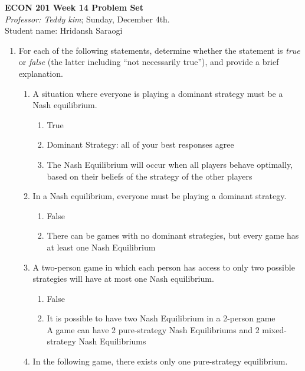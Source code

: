 \documentclass[11pt]{article}
\begin{document}
\begin{center}
\textbf{ECON 201 Week 14 Problem Set}\\
\textit {Professor: Teddy kim};  
Sunday, December 4th.
\\Student name: Hridansh Saraogi
\end{center}

\begin{enumerate}
\item For each of the following statements, determine whether
the statement is \emph{true} or \emph{false} (the latter including ``not necessarily true''), and provide a brief explanation.
    \begin{enumerate}
    \item A situation where everyone is playing a dominant strategy must be a Nash equilibrium.
    \begin{enumerate}
        \item True
        \item Dominant Strategy: all of your best responses agree
        \item The Nash Equilibrium will occur when all players behave optimally, based on their beliefs of the strategy of the other players
    \end{enumerate}

    \item In a Nash equilibrium, everyone must be playing a dominant strategy.
    \begin{enumerate}
        \item False
        \item There can be games with no dominant strategies, but every game has at least one Nash Equilibrium
    \end{enumerate}

    \item A two-person game in which each person has access to only two possible strategies will have at most one Nash equilibrium.
    \begin{enumerate}
        \item False
        \item It is possible to have two Nash Equilibrium in a 2-person game
        \\ A game can have 2 pure-strategy Nash Equilibriums and 2 mixed-strategy Nash Equilibriums
    \end{enumerate}

    \item In the following game, there exists only one pure-strategy equilibrium.
        \begin{figure}[h!]
    \begin{center}
\begin{tikzpicture}[scale=0.6]
	

\end{tikzpicture}
\end{center}
\end{figure}
\end{enumerate}
\end{enumerate}
\end{document}
